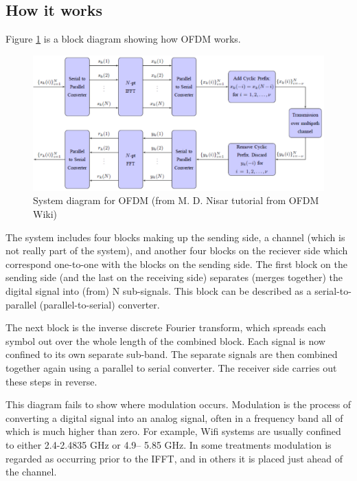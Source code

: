 \subsection{How it works}

Figure \ref{ofdmfig} is a block diagram showing how OFDM works.
\begin{figure}
\begin{center}
\includegraphics[width=15 cm]{ofdmfig.png}
\caption{System diagram for OFDM (from M. D. Nisar tutorial from OFDM Wiki)}\label{ofdmfig}
\end{center}
\end{figure}

The system includes four blocks making up the sending side, a channel (which is not really
part of the system), and another four blocks on the reciever side which correspond one-to-one
with the blocks on the sending side. The first block on the sending side (and the last on the
receiving side) separates (merges together) the digital signal into (from) N sub-signals. This
block can be described as a serial-to-parallel (parallel-to-serial) converter.

The next block is the inverse discrete Fourier transform, which spreads each symbol out over
the whole length of the combined block. Each signal is now confined to its own separate
sub-band. The separate signals are then combined together again using a parallel to serial
converter. The receiver side carries out these steps in reverse.

This diagram fails to show where modulation occurs. Modulation is the process of converting
a digital signal into an analog signal, often in a frequency band all of which is much higher
than zero. For example, Wifi systems are usually confined to either 2.4-2.4835 GHz or 4.9–
5.85 GHz. In some treatments modulation is regarded as occurring prior to the IFFT, and in
others it is placed just ahead of the channel.


